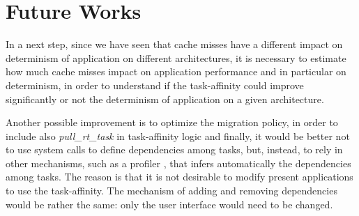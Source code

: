 \section{Future Works}

In a next step, since we have seen that cache misses have a different impact on determinism of application on different architectures, it is necessary to 
estimate how much cache misses impact on application performance and in particular on determinism, in order to understand if the task-affinity could 
improve significantly or not the determinism of application on a given architecture. 

Another possible improvement is to optimize the migration policy, in order to include also \textit{pull\_rt\_task} in task-affinity logic and finally, it 
would be better not to use system calls to define dependencies among tasks, but, instead, to rely in other mechanisms, such as a profiler \cite{calandro}, 
that infers automatically the dependencies among tasks. The reason is that it is not desirable to modify present applications to use the task-affinity. 
The mechanism of adding and removing dependencies would be rather the same: only the user interface would need to be changed.

